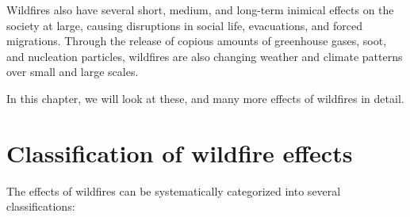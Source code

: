 \documentclass[
  12 pt,
]{Nemilov}
\begin{document}
Wildfires also have several short, medium, and long-term inimical effects on the society at large, causing disruptions in social life, evacuations, and forced migrations. Through the release of copious amounts of greenhouse gases, soot, and nucleation particles, wildfires are also changing weather and climate patterns over small and large scales.

In this chapter, we will look at these, and many more effects of wildfires in detail.

\section{Classification of wildfire effects}\label{classification-of-wildfire-effects}

The effects of wildfires can be systematically categorized into several classifications:
\end{document}
